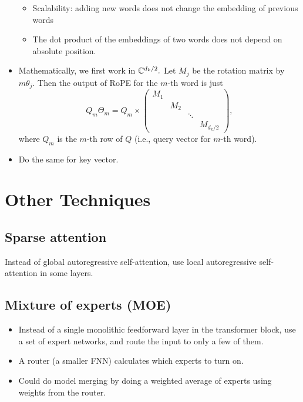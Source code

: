 \begin{itemize}
        \begin{itemize}
            \item Scalability: adding new words does not change the embedding of previous words
            \item The dot product of the embeddings of two words does not depend on absolute position.
        \end{itemize}
    \item Mathematically, we first work in $\mathbb{C}^{d_k/2}.$ Let $M_j$ be the rotation matrix by $m \theta_j.$ Then the output of RoPE for the $m$-th word is just
    \begin{equation*}
        Q_m\Theta_m = Q_m \times
        \begin{pmatrix}
        M_1 & & & \\
        & M_2 & & \\
        & & \ddots & \\
        & & & M_{d_k/2}
        \end{pmatrix},
    \end{equation*}
    where $Q_m$ is the $m$-th row of $Q$ (i.e., query vector for $m$-th word).
    \item Do the same for key vector.
\end{itemize}

\section{Other Techniques}
\subsection{Sparse attention}
Instead of global autoregressive self-attention, use local autoregressive self-attention in some layers.

\subsection{Mixture of experts (MOE)}
\begin{itemize}
    \item Instead of a single monolithic feedforward layer in the transformer block, use a set of expert networks, and route the input to only a few of them.
    \item A router (a smaller FNN) calculates which experts to turn on.
    \item Could do model merging by doing a weighted average of experts using weights from the router.
\end{itemize}

